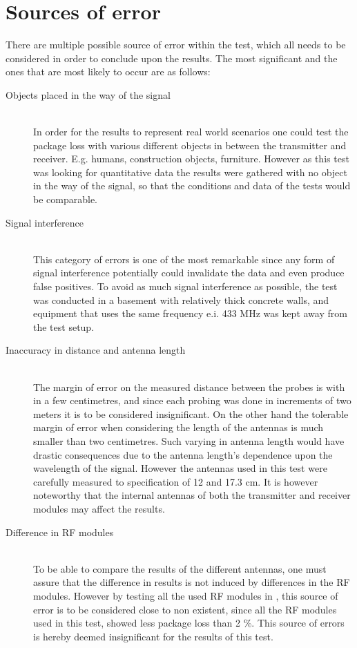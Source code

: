 \section*{Sources of error}
There are multiple possible source of error within the test, which all needs to be considered in order to conclude upon the results.
The most significant and the ones that are most likely to occur are as follows:
\begin{description}
    \item[Objects placed in the way of the signal] \hfill \\
    In order for the results to represent real world scenarios one could test the package loss with various different objects in between the transmitter and receiver. 
    E.g. humans, construction objects, furniture.
    However as this test was     looking for quantitative data the results were gathered with no object in the way of the signal, so that the conditions and data of the tests would be comparable.
    \item[Signal interference] \hfill \\
    This category of errors is one of the most remarkable since any form of signal interference potentially could invalidate the data and even produce false positives.
    To avoid as much signal interference as possible, the test was conducted in a basement with relatively thick concrete walls, and equipment that uses the same frequency e.i. 433 MHz was kept away from the test setup.
    \item[Inaccuracy in distance and antenna length] \hfill \\
    The margin of error on the measured distance between the probes is with in a few centimetres, and since each probing was done in increments of two meters it is to be considered insignificant.
    On the other hand the tolerable margin of error when considering the length of the antennas is much smaller than two centimetres.
    Such varying in antenna length would have drastic consequences due to the antenna length's dependence upon the wavelength of the signal.
    However the antennas used in this test were carefully measured to specification of 12 and 17.3 cm.
    It is however noteworthy that the internal antennas of both the transmitter and receiver modules may affect the results.
    \item[Difference in RF modules] \hfill \\
    To be able to compare the results of the different antennas, one must assure that the difference in results is not induced by differences in the RF modules.
    However by testing all the used RF modules in , this source of error is to be considered close to non existent, since all the RF modules used in this test, showed less package loss than 2 \%.
    This source of errors is hereby deemed insignificant for the results of this test.
\end{description}

